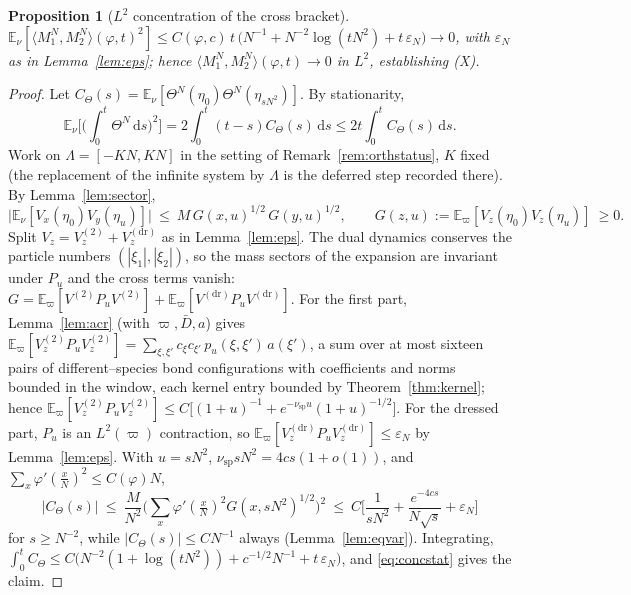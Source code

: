 \documentclass[11pt]{article}
\theoremstyle{plain}
\newtheorem{proposition}[theorem]{Proposition}
\theoremstyle{definition}
\theoremstyle{remark}
\newcommand{\E}{\mathbb{E}}\newcommand{\PP}{\mathbb{P}}\newcommand{\dd}{\,\mathrm{d}}
\newcommand{\eps}{\varepsilon}\newcommand{\Exp}{\mathrm{Exp}}
\begin{document}
\begin{proposition}[$L^2$ concentration of the cross bracket]\label{prop:conc}
$\E_\nu[\langle M_1^N,M_2^N\rangle(\varphi,t)^2]\le
C(\varphi,c)\,t\,\big(N^{-1}+N^{-2}\log(tN^2)+t\,\eps_N\big)\to0$, with $\eps_N$ as
in Lemma~\ref{lem:eps}; hence $\langle M_1^N,M_2^N\rangle(\varphi,t)\to0$ in $L^2$,
establishing \textup{(X)}.
\end{proposition}
\begin{proof}
Let $C_\Theta(s)=\E_\nu[\Theta^N(\eta_0)\Theta^N(\eta_{sN^2})]$. By stationarity,
\begin{equation}\label{eq:concstat}
  \E_\nu\Big[\Big(\int_0^t\Theta^N\dd s\Big)^2\Big]=2\int_0^t(t-s)C_\Theta(s)\dd s
  \le 2t\int_0^t C_\Theta(s)\dd s.
\end{equation}
Work on $\Lambda=[-KN,KN]$ in the setting of Remark~\ref{rem:orthstatus}, $K$ fixed
(the replacement of the infinite system by $\Lambda$ is the deferred step recorded
there). By Lemma~\ref{lem:sector},
\[
  \big|\E_\nu[V_x(\eta_0)V_y(\eta_u)]\big|\ \le\ M\,G(x,u)^{1/2}\,G(y,u)^{1/2},
  \qquad G(z,u):=\E_\varpi[V_z(\eta_0)V_z(\eta_u)]\ \ge0 .
\]
Split $V_z=V^{(2)}_z+V^{(\mathrm{dr})}_z$ as in Lemma~\ref{lem:eps}. The dual
dynamics conserves the particle numbers $(|\xi_1|,|\xi_2|)$, so the mass sectors of
the expansion are invariant under $P_u$ and the cross terms vanish:
$G=\E_\varpi[V^{(2)}P_uV^{(2)}]+\E_\varpi[V^{(\mathrm{dr})}P_uV^{(\mathrm{dr})}]$.
For the first part, Lemma~\ref{lem:acr} (with $\varpi,\bar D,a$) gives
$\E_\varpi[V^{(2)}_zP_uV^{(2)}_z]=\sum_{\xi,\xi'}c_\xi c_{\xi'}\,p_u(\xi,\xi')\,a(\xi')$,
a sum over at most sixteen pairs of different--species bond configurations with
coefficients and norms bounded in the window, each kernel entry bounded by
Theorem~\ref{thm:kernel}; hence
$\E_\varpi[V^{(2)}_zP_uV^{(2)}_z]\le
C\big[(1+u)^{-1}+e^{-\nu_{\mathrm{sp}}u}(1+u)^{-1/2}\big]$. For the dressed part,
$P_u$ is an $L^2(\varpi)$ contraction, so
$\E_\varpi[V^{(\mathrm{dr})}_zP_uV^{(\mathrm{dr})}_z]\le\eps_N$ by
Lemma~\ref{lem:eps}. With $u=sN^2$, $\nu_{\mathrm{sp}}sN^2=4cs(1+o(1))$, and
$\sum_x\varphi'(\tfrac xN)^2\le C(\varphi)N$,
\begin{equation}\label{eq:Ctheta}
  |C_\Theta(s)|\ \le\ \frac{M}{N^2}\Big(\sum_x\varphi'(\tfrac xN)^2G(x,sN^2)^{1/2}\Big)^{\!2}
  \ \le\ C\Big[\frac1{sN^2}+\frac{e^{-4cs}}{N\sqrt s}+\eps_N\Big]
\end{equation}
for $s\ge N^{-2}$, while $|C_\Theta(s)|\le CN^{-1}$ always (Lemma~\ref{lem:eqvar}).
Integrating, $\int_0^tC_\Theta\le
C\big(N^{-2}(1+\log(tN^2))+c^{-1/2}N^{-1}+t\,\eps_N\big)$, and \eqref{eq:concstat}
gives the claim.
\end{proof}
\end{document}
